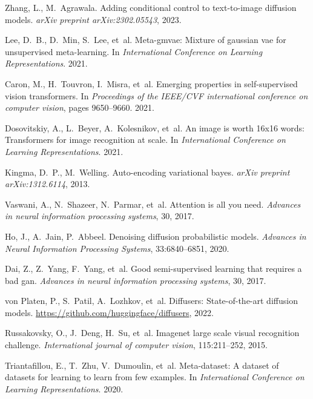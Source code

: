\documentclass{article}
\begin{document}
\begin{thebibliography}{10}
	Zhang, L., M.~Agrawala.
	\newblock Adding conditional control to text-to-image diffusion models.
	\newblock \emph{arXiv preprint arXiv:2302.05543}, 2023.
	
	Lee, D.~B., D.~Min, S.~Lee, et~al.
	\newblock Meta-gmvae: Mixture of gaussian vae for unsupervised meta-learning.
	\newblock In \emph{International Conference on Learning Representations}. 2021.
	
	Caron, M., H.~Touvron, I.~Misra, et~al.
	\newblock Emerging properties in self-supervised vision transformers.
	\newblock In \emph{Proceedings of the IEEE/CVF international conference on
		computer vision}, pages 9650--9660. 2021.
	
	Dosovitskiy, A., L.~Beyer, A.~Kolesnikov, et~al.
	\newblock An image is worth 16x16 words: Transformers for image recognition at
	scale.
	\newblock In \emph{International Conference on Learning Representations}. 2021.
	
	Kingma, D.~P., M.~Welling.
	\newblock Auto-encoding variational bayes.
	\newblock \emph{arXiv preprint arXiv:1312.6114}, 2013.
	
	Vaswani, A., N.~Shazeer, N.~Parmar, et~al.
	\newblock Attention is all you need.
	\newblock \emph{Advances in neural information processing systems}, 30, 2017.
	
	Ho, J., A.~Jain, P.~Abbeel.
	\newblock Denoising diffusion probabilistic models.
	\newblock \emph{Advances in Neural Information Processing Systems},
	33:6840--6851, 2020.
	
	Dai, Z., Z.~Yang, F.~Yang, et~al.
	\newblock Good semi-supervised learning that requires a bad gan.
	\newblock \emph{Advances in neural information processing systems}, 30, 2017.
	
	von Platen, P., S.~Patil, A.~Lozhkov, et~al.
	\newblock Diffusers: State-of-the-art diffusion models.
	\newblock \url{https://github.com/huggingface/diffusers}, 2022.
	
	Russakovsky, O., J.~Deng, H.~Su, et~al.
	\newblock Imagenet large scale visual recognition challenge.
	\newblock \emph{International journal of computer vision}, 115:211--252, 2015.
	
	Triantafillou, E., T.~Zhu, V.~Dumoulin, et~al.
	\newblock Meta-dataset: A dataset of datasets for learning to learn from few
	examples.
	\newblock In \emph{International Conference on Learning Representations}. 2020.
	

\end{thebibliography}
\end{document}
